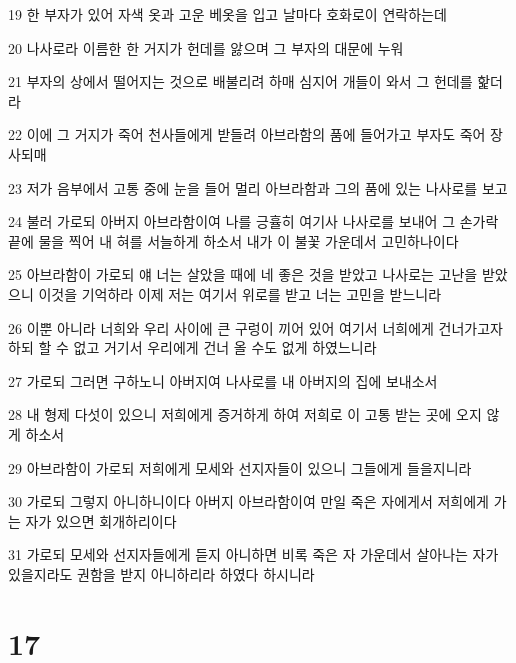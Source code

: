 \par 19 한 부자가 있어 자색 옷과 고운 베옷을 입고 날마다 호화로이 연락하는데
\par 20 나사로라 이름한 한 거지가 헌데를 앓으며 그 부자의 대문에 누워
\par 21 부자의 상에서 떨어지는 것으로 배불리려 하매 심지어 개들이 와서 그 헌데를 핥더라
\par 22 이에 그 거지가 죽어 천사들에게 받들려 아브라함의 품에 들어가고 부자도 죽어 장사되매
\par 23 저가 음부에서 고통 중에 눈을 들어 멀리 아브라함과 그의 품에 있는 나사로를 보고
\par 24 불러 가로되 아버지 아브라함이여 나를 긍휼히 여기사 나사로를 보내어 그 손가락 끝에 물을 찍어 내 혀를 서늘하게 하소서 내가 이 불꽃 가운데서 고민하나이다
\par 25 아브라함이 가로되 얘 너는 살았을 때에 네 좋은 것을 받았고 나사로는 고난을 받았으니 이것을 기억하라 이제 저는 여기서 위로를 받고 너는 고민을 받느니라
\par 26 이뿐 아니라 너희와 우리 사이에 큰 구렁이 끼어 있어 여기서 너희에게 건너가고자 하되 할 수 없고 거기서 우리에게 건너 올 수도 없게 하였느니라
\par 27 가로되 그러면 구하노니 아버지여 나사로를 내 아버지의 집에 보내소서
\par 28 내 형제 다섯이 있으니 저희에게 증거하게 하여 저희로 이 고통 받는 곳에 오지 않게 하소서
\par 29 아브라함이 가로되 저희에게 모세와 선지자들이 있으니 그들에게 들을지니라
\par 30 가로되 그렇지 아니하니이다 아버지 아브라함이여 만일 죽은 자에게서 저희에게 가는 자가 있으면 회개하리이다
\par 31 가로되 모세와 선지자들에게 듣지 아니하면 비록 죽은 자 가운데서 살아나는 자가 있을지라도 권함을 받지 아니하리라 하였다 하시니라

\chapter{17}


